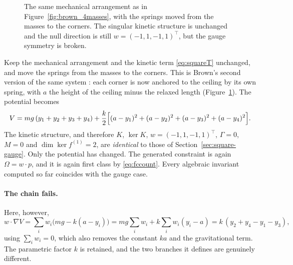 \documentclass[12pt]{article}
\theoremstyle{plain}
\theoremstyle{definition}
\theoremstyle{remark}
\newcommand{\Om}{\Omega}
\begin{document}
\begin{figure}[htbp]
		\caption{The same mechanical arrangement as in
			Figure~\ref{fig:brown_4masses}, with the springs moved from the masses to
			the corners. The singular kinetic structure is unchanged and the null
			direction is still $w=(-1,1,-1,1)^{\top}$, but the gauge symmetry is broken.}
		\label{fig:square-control}
	\end{figure}
	
	Keep the mechanical arrangement and the kinetic term \eqref{eq:squareT}
	unchanged, and move the springs from the masses to the corners. This is Brown's
	second version of the same system \cite{Brown2023}: each corner is now anchored
	to the ceiling by its own spring, with $a$ the height of the ceiling minus the
	relaxed length (Figure~\ref{fig:square-control}). The potential becomes
	\begin{equation}
		V=mg\,(y_{1}+y_{2}+y_{3}+y_{4})
		+\frac{k}{2}\Bigl[(a-y_{1})^{2}+(a-y_{2})^{2}
		+(a-y_{3})^{2}+(a-y_{4})^{2}\Bigr].
		\label{eq:controlV}
	\end{equation}
	The kinetic structure, and therefore $K$, $\ker K$, $w=(-1,1,-1,1)^{\top}$,
	$\Gamma=0$, $M=0$ and $\dim\ker f^{(1)}=2$, are \emph{identical} to those of
	Section~\ref{sec:square-gauge}. Only the potential has changed. The generated constraint is again
	$\Om=w\!\cdot\!p$, and it is again first class by \eqref{eq:fccount}. Every
	algebraic invariant computed so far coincides with the gauge case.
	
	\paragraph{The chain fails.} Here, however,
	\begin{equation}
		w\!\cdot\!\nabla V
		=\sum_{i}w_{i}\bigl(mg-k(a-y_{i})\bigr)
		=mg\sum_{i}w_{i}+k\sum_{i}w_{i}(y_{i}-a)
		=k\,(y_{2}+y_{4}-y_{1}-y_{3}),
		\label{eq:controlPhi}
	\end{equation}
	using $\sum_{i}w_{i}=0$, which also removes the constant $ka$ and the
	gravitational term. The parametric factor $k$ is retained, and the two branches
	it defines are genuinely different.
	
\end{document}
